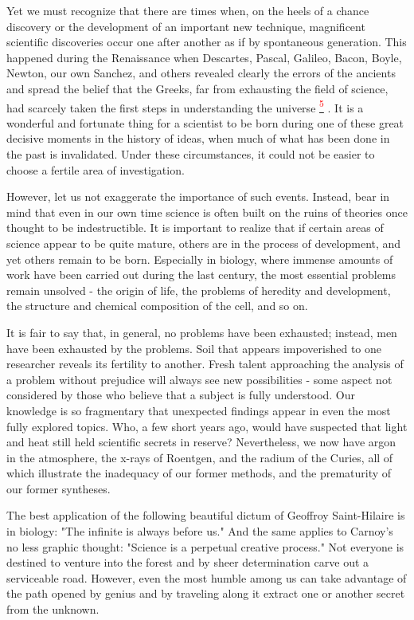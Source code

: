 \documentclass{article}
\newcommand{\noteref}[1]{%
 \hypertarget{ref:#1}{}%
 \hyperlink{note:#1}{\textsuperscript{\textcolor{red}{#1}}}%
}
\begin{document}
Yet we must recognize that there are times when, on the heels of a chance discovery or the development of an important new technique, magnificent scientific discoveries occur one after another as if by spontaneous generation. This happened during the Renaissance when Descartes, Pascal, Galileo, Bacon, Boyle, Newton, our own Sanchez, and others revealed clearly the errors of the ancients and spread the belief that the Greeks, far from exhausting the field of science, had scarcely taken the first steps in understanding the universe\noteref{5}. It is a wonderful and fortunate thing for a scientist to be born during one of these great decisive moments in the history of ideas, when much of what has been done in the past is invalidated. Under these circumstances, it could not be easier to choose a fertile area of investigation.

However, let us not exaggerate the importance of such events. Instead, bear in mind that even in our own time science is often built on the ruins of theories once thought to be indestructible. It is important to realize that if certain areas of science appear to be quite mature, others are in the process of development, and yet others remain to be born. Especially in biology, where immense amounts of work have been carried out during the last century, the most essential problems remain unsolved - the origin of life, the problems of heredity and development, the structure and chemical composition of the cell, and so on.

It is fair to say that, in general, no problems have been exhausted; instead, men have been exhausted by the problems. Soil that appears impoverished to one researcher reveals its fertility to another. Fresh talent approaching the analysis of a problem without prejudice will always see new possibilities - some aspect not considered by those who believe that a subject is fully understood. Our knowledge is so fragmentary that unexpected findings appear in even the most fully explored topics. Who, a few short years ago, would have suspected that light and heat still held scientific secrets in reserve? Nevertheless, we now have argon in the atmosphere, the x-rays of Roentgen, and the radium of the Curies, all of which illustrate the inadequacy of our former methods, and the prematurity of our former syntheses.

The best application of the following beautiful dictum of Geoffroy Saint-Hilaire is in biology: "The infinite is always before us." And the same applies to Carnoy’s no less graphic thought: "Science is a perpetual creative process." Not everyone is destined to venture into the forest and by sheer determination carve out a serviceable road. However, even the most humble among us can take advantage of the path opened by genius and by traveling along it extract one or another secret from the unknown.
\end{document}
